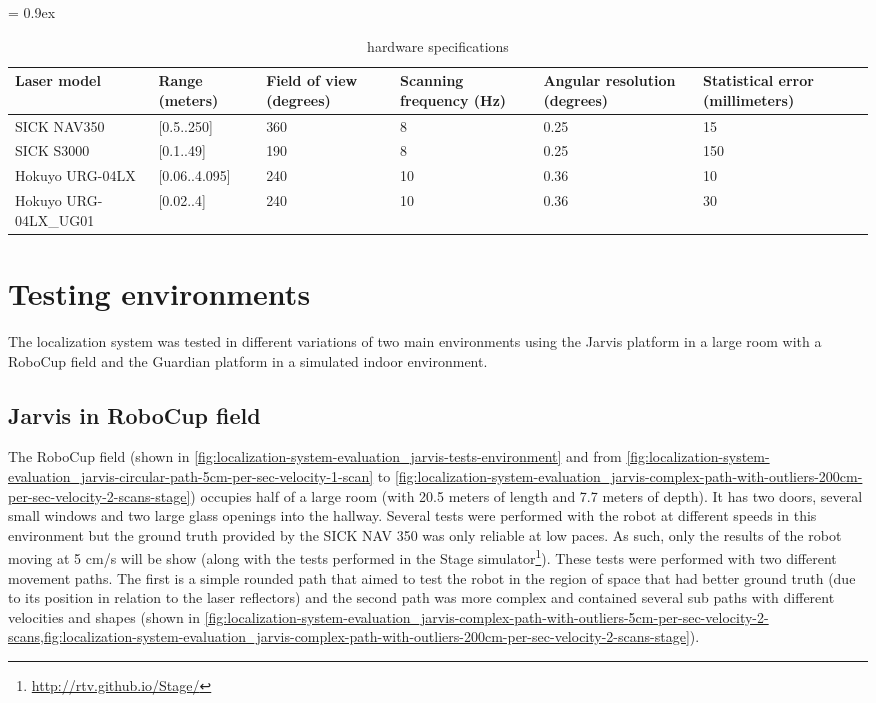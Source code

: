 \begin{table}
	\caption{ hardware specifications}
	\tabulinesep = 0.9ex
	\centering
	\begin{tabu} { X[2.5,m,c] | X[m,c] X[m,c] X[m,c] X[m,c] X[m,c] }
		\rowfont{\bfseries\itshape} Laser model & Range (meters) & Field of view (degrees) & Scanning frequency (Hz) & Angular resolution (degrees) & Statistical error (millimeters) \\
		\hline
		{\small SICK NAV350} 			& [0.5..250] 	& 360 	& 8 	& 0.25 	& 15 	\\
		{\small SICK S3000} 			& [0.1..49] 	& 190 	& 8 	& 0.25 	& 150 	\\
		{\small Hokuyo URG-04LX} 		& [0.06..4.095] & 240 	& 10 	& 0.36 	& 10 	\\
		{\small Hokuyo URG-04LX\_UG01} 	& [0.02..4] 	& 240 	& 10 	& 0.36 	& 30 	\\
	\end{tabu}
	\label{tab:localization-system-evaluation_laser-hardware-specifications}
\end{table}


\section{Testing environments}

The localization system was tested in different variations of two main environments using the Jarvis platform in a large room with a RoboCup field and the Guardian platform in a simulated indoor environment.


\subsection{Jarvis in RoboCup field}

The RoboCup field (shown in \cref{fig:localization-system-evaluation_jarvis-tests-environment} and from \cref{fig:localization-system-evaluation_jarvis-circular-path-5cm-per-sec-velocity-1-scan} to \cref{fig:localization-system-evaluation_jarvis-complex-path-with-outliers-200cm-per-sec-velocity-2-scans-stage}) occupies half of a large room (with 20.5 meters of length and 7.7 meters of depth). It has two doors, several small windows and two large glass openings into the hallway. Several tests were performed with the robot at different speeds in this environment but the ground truth provided by the SICK NAV 350 was only reliable at low paces. As such, only the results of the robot moving at 5 cm/s will be show (along with the tests performed in the Stage simulator\footnote{\url{http://rtv.github.io/Stage/}}). These tests were performed with two different movement paths. The first is a simple rounded path that aimed to test the robot in the region of space that had better ground truth (due to its position in relation to the laser reflectors) and the second path was more complex and contained several sub paths with different velocities and shapes (shown in \cref{fig:localization-system-evaluation_jarvis-complex-path-with-outliers-5cm-per-sec-velocity-2-scans,fig:localization-system-evaluation_jarvis-complex-path-with-outliers-200cm-per-sec-velocity-2-scans-stage}).


